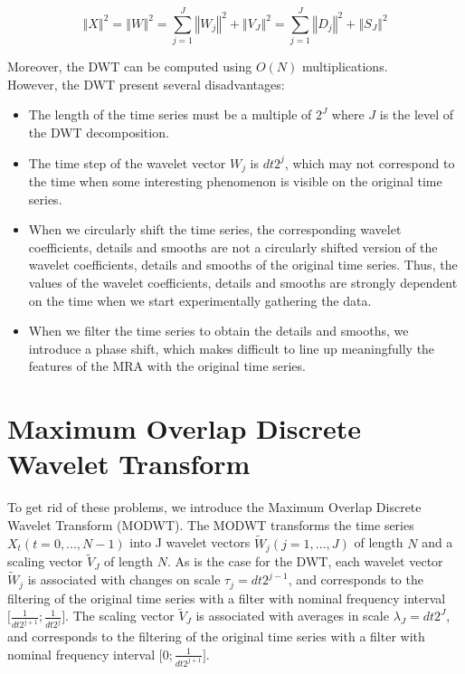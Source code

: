 \documentclass[methods.tex]{subfiles}
\begin{document}
\begin{equation}
\left\Vert X \right\Vert ^2 = \left\Vert W \right\Vert ^2 = \sum_{j = 1}^{J} \left\Vert W_j \right\Vert ^2 + \left\Vert V_J \right\Vert ^2 = \sum_{j = 1}^{J} \left\Vert D_j \right\Vert ^2 + \left\Vert S_J \right\Vert ^2
\end{equation}

Moreover, the DWT can be computed using $O \left( N \right)$ multiplications. \\

However, the DWT present several disadvantages:

\begin{itemize}
	\item The length of the time series must be a multiple of $2^J$ where $J$ is the level of the DWT decomposition.
	\item The time step of the wavelet vector $W_j$ is $dt 2^j$, which may not correspond to the time when some interesting phenomenon is visible on the original time series.
	\item When we circularly shift the time series, the corresponding wavelet coefficients, details and smooths are not a circularly shifted version of the wavelet coefficients, details and smooths of the original time series. Thus, the values of the wavelet coefficients, details and smooths are strongly dependent on the time when we start experimentally gathering the data.
	\item When we filter the time series to obtain the details and smooths, we introduce a phase shift, which makes difficult to line up meaningfully the features of the MRA with the original time series.
\end{itemize}

\section{Maximum Overlap Discrete Wavelet Transform}

To get rid of these problems, we introduce the Maximum Overlap Discrete Wavelet Transform (MODWT). The MODWT transforms the time series $X_t \left( t = 0, ... , N - 1 \right)$ into J wavelet vectors $\widetilde{W}_j \left( j = 1 , ... , J \right)$ of length $N$ and a scaling vector $\widetilde{V}_J$ of length $N$. As is the case for the DWT, each wavelet vector $\widetilde{W}_j$ is associated with changes on scale $\tau_j = dt 2^{j - 1}$, and corresponds to the filtering of the original time series with a filter with nominal frequency interval $\lbrack \frac{1}{dt 2^{j + 1}} ; \frac{1}{dt 2^j} \rbrack$. The scaling vector $\widetilde{V}_J$ is associated with averages in scale $\lambda_J = dt 2^J$, and corresponds to the filtering of the original time series with a filter with nominal frequency interval $\lbrack 0 ; \frac{1}{dt 2^{j + 1}} \rbrack$. \\
\end{document}
